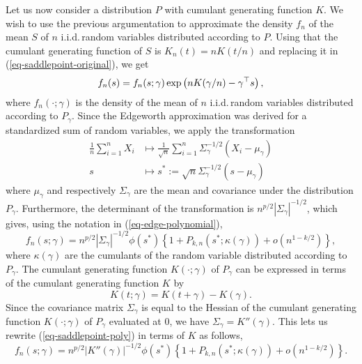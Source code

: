 Let us now consider a distribution $P$ with cumulant generating function $K$. We wish to use the previous argumentation to approximate the density $f_n$ of the mean $S$ of $n$ i.i.d.\,random variables distributed according to $P$. Using that the cumulant generating function of $S$ is $K_n(t) = nK(t/n)$ and replacing it in (\ref{eq-saddlepoint-original}), we get
\begin{equation} \label{eq-fn-in-terms-of-fngamma}
    f_n(s) = f_n(s; \gamma)\exp\left(nK(\gamma / n) - \gamma^\top s\right),
\end{equation}
where $f_n(\cdot; \gamma)$ is the density of the mean of $n$ i.i.d.\,random variables distributed according to $P_\gamma$. Since the Edgeworth approximation was derived for a standardized sum of random variables, we apply the transformation
\begin{align*}
    \frac{1}{n}\sum_{i=1}^n X_i &\mapsto \frac{1}{\sqrt{n}}\sum_{i=1}^n \Sigma_\gamma^{-1/2}(X_i - \mu_\gamma)\\
    s &\mapsto s^* := \sqrt{n}\Sigma_\gamma^{-1/2}(s - \mu_\gamma)
\end{align*}
where $\mu_\gamma$ and respectively $\Sigma_\gamma$ are the mean and covariance under the distribution $P_\gamma$. Furthermore, the determinant of the transformation is $n^{p/2}|\Sigma_\gamma|^{-1/2}$, which gives, using the notation in (\ref{eq-edge-polynomial}),
\begin{equation} \label{eq-saddlepoint-poly}
    f_n(s; \gamma) = n^{p/2}|\Sigma_\gamma|^{-1/2} \phi(s^*)\left\{ 1 + P_{k, n}(s^*; \kappa(\gamma)) + o(n^{1-k/2})\right\},
\end{equation}
where $\kappa(\gamma)$ are the cumulants of the random variable distributed according to $P_\gamma$. The cumulant generating function $K(\cdot; \gamma)$ of $P_\gamma$ can be expressed in terms of the cumulant generating function $K$ by
\begin{equation*}
    K(t; \gamma) = K(t + \gamma) - K(\gamma).
\end{equation*}
Since the covariance matrix $\Sigma_\gamma$ is equal to the Hessian of the cumulant generating function $K(\cdot; \gamma)$ of $P_\gamma$ evaluated at 0, we have $\Sigma_\gamma = K''(\gamma)$. This lets us rewrite (\ref{eq-saddlepoint-poly}) in terms of $K$ as follows,
\begin{equation*}
    f_n(s; \gamma) = n^{p/2}|K''(\gamma)|^{-1/2} \phi(s^*)\left\{ 1 + P_{k, n}(s^*; \kappa(\gamma)) + o(n^{1-k/2})\right\}.
\end{equation*}

